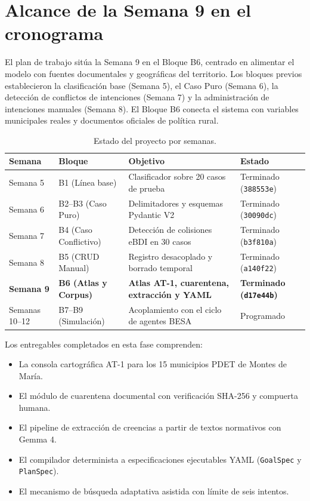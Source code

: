 \documentclass[11pt,a4paper]{article}
\begin{document}
\section{Alcance de la Semana 9 en el cronograma}

El plan de trabajo sitúa la Semana 9 en el Bloque B6, centrado en alimentar el modelo con fuentes documentales y geográficas del territorio. Los bloques previos establecieron la clasificación base (Semana 5), el Caso Puro (Semana 6), la detección de conflictos de intenciones (Semana 7) y la administración de intenciones manuales (Semana 8). El Bloque B6 conecta el sistema con variables municipales reales y documentos oficiales de política rural.

\begin{table}[H]
\centering
\small
\caption{Estado del proyecto por semanas.}
\label{tab:cronograma}
\begin{tabularx}{\textwidth}{lp{3.6cm}p{4.8cm}X}
\toprule
\textbf{Semana} & \textbf{Bloque} & \textbf{Objetivo} & \textbf{Estado} \\
\midrule
Semana 5 & B1 (Línea base) & Clasificador sobre 20 casos de prueba & Terminado (\texttt{388553e}) \\
Semana 6 & B2--B3 (Caso Puro) & Delimitadores y esquemas Pydantic V2 & Terminado (\texttt{30090dc}) \\
Semana 7 & B4 (Caso Conflictivo) & Detección de colisiones eBDI en 30 casos & Terminado (\texttt{b3f810a}) \\
Semana 8 & B5 (CRUD Manual) & Registro desacoplado y borrado temporal & Terminado (\texttt{a140f22}) \\
\textbf{Semana 9} & \textbf{B6 (Atlas y Corpus)} & \textbf{Atlas AT-1, cuarentena, extracción y YAML} & \textbf{Terminado (\texttt{d17e44b})} \\
Semanas 10--12 & B7--B9 (Simulación) & Acoplamiento con el ciclo de agentes BESA & Programado \\
\bottomrule
\end{tabularx}
\end{table}

Los entregables completados en esta fase comprenden:
\begin{itemize}[leftmargin=*]
    \item La consola cartográfica AT-1 para los 15 municipios PDET de Montes de María.
    \item El módulo de cuarentena documental con verificación SHA-256 y compuerta humana.
    \item El pipeline de extracción de creencias a partir de textos normativos con Gemma 4.
    \item El compilador determinista a especificaciones ejecutables YAML (\texttt{GoalSpec} y \texttt{PlanSpec}).
    \item El mecanismo de búsqueda adaptativa asistida con límite de seis intentos.
\end{itemize}
\end{document}

